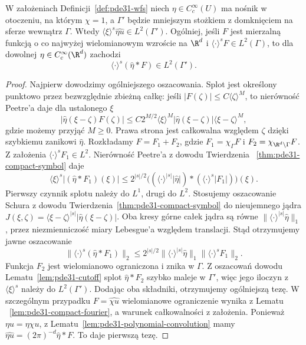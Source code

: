 \begin{lemat}
\label{lem:pde31-sobolev-cutoff}
W założeniach Definicji~\ref{def:pde31-wfs}
niech $\eta\in C_c^\infty(U)$ ma nośnik w otoczeniu,
na którym $\chi=1$, a $\Gamma'$ będzie mniejszym
stożkiem z domknięciem na sferze wewnątrz $\Gamma$.
Wtedy
$\langle\xi\rangle^s\widehat{\eta u}\in L^2(\Gamma')$.
Ogólniej, jeśli $F$ jest mierzalną funkcją
o co najwyżej wielomianowym wzroście na $\R^d$
i $\langle\cdot\rangle^sF\in L^2(\Gamma)$,
to dla dowolnej $\eta\in C_c^\infty(\R^d)$
zachodzi
\[
 \langle\cdot\rangle^s(\widehat\eta*F)\in L^2(\Gamma').
\]
\end{lemat}
\begin{proof}
Najpierw dowodzimy ogólniejszego oszacowania.
Splot jest określony punktowo przez bezwzględnie
zbieżną całkę: jeśli $|F(\zeta)|\le C\langle\zeta\rangle^M$,
to nierówność Peetre'a daje dla ustalonego $\xi$
\[
 |\widehat\eta(\xi-\zeta)F(\zeta)|
 \le C2^{M/2}\langle\xi\rangle^M
 |\widehat\eta(\xi-\zeta)|\langle\xi-\zeta\rangle^M,
\]
gdzie możemy przyjąć $M\ge0$. Prawa strona jest
całkowalna względem $\zeta$ dzięki szybkiemu
zanikowi $\widehat\eta$.
Rozkładamy $F=F_1+F_2$, gdzie
$F_1=\chi_\Gamma F$ i $F_2=\chi_{\R^d\setminus\Gamma}F$.
Z założenia $\langle\cdot\rangle^s F_1\in L^2$.
Nierówność Peetre'a z dowodu Twierdzenia
~\ref{thm:pde31-compact-symbol} daje
\[
 \langle\xi\rangle^s|(\widehat\eta*F_1)(\xi)|
 \le 2^{|s|/2}
 \bigl((\langle\cdot\rangle^{|s|}|\widehat\eta|)
 *(\langle\cdot\rangle^s|F_1|)\bigr)(\xi).
\]
Pierwszy czynnik splotu należy do $L^1$,
drugi do $L^2$. Stosujemy oszacowanie Schura
z dowodu Twierdzenia~\ref{thm:pde31-compact-symbol}
do nieujemnego jądra
$J(\xi,\zeta)=\langle\xi-\zeta\rangle^{|s|}
|\widehat\eta(\xi-\zeta)|$.
Oba kresy górne całek jądra są równe
$\|\langle\cdot\rangle^{|s|}\widehat\eta\|_1$,
przez niezmienniczość miary Lebesgue'a względem
translacji. Stąd otrzymujemy jawne oszacowanie
\[
 \|\langle\cdot\rangle^s(\widehat\eta*F_1)\|_2
 \le 2^{|s|/2}
 \|\langle\cdot\rangle^{|s|}\widehat\eta\|_1
 \|\langle\cdot\rangle^s F_1\|_2.
\]
Funkcja $F_2$ jest wielomianowo ograniczona
i znika w $\Gamma$. Z oszacowań dowodu
Lematu~\ref{lem:pde31-cutoff} splot
$\widehat\eta*F_2$ szybko maleje w $\Gamma'$,
więc jego iloczyn z $\langle\xi\rangle^s$
należy do $L^2(\Gamma')$.
Dodając oba składniki, otrzymujemy ogólniejszą tezę.
W szczególnym przypadku $F=\widehat{\chi u}$
wielomianowe ograniczenie wynika z Lematu
~\ref{lem:pde31-compact-fourier}, a warunek
całkowalności z założenia. Ponieważ $\eta u=\eta\chi u$,
z Lematu~\ref{lem:pde31-polynomial-convolution}
mamy $\widehat{\eta u}=(2\pi)^{-d}\widehat\eta*F$.
To daje pierwszą tezę.
\end{proof}

